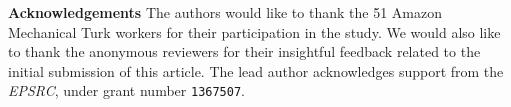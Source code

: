 \begin{abstract}
\end{abstract}








\vspace*{4mm}
\noindent\textbf{Acknowledgements} The authors would like to thank the 51 Amazon Mechanical Turk workers for their participation in the study. We would also like to thank the anonymous reviewers for their insightful feedback related to the initial submission of this article. The lead author acknowledges support from the \emph{EPSRC}, under grant number \texttt{1367507}.

%
 






%
%



